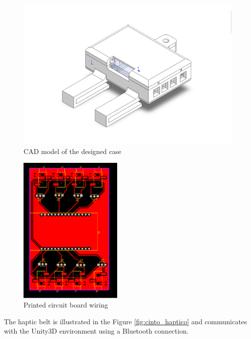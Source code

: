         \begin{figure}[!htb]
            \centering
            \includegraphics[width = 0.8\linewidth]{Metodologia/Case Cinto.png}
            \caption{CAD model of the designed case}
            \label{fig:case_cinto}
        \end{figure}

        \begin{figure}[htbp]
            \centering
            \includegraphics[width=0.45\textwidth, angle = 90, origin = c]{Metodologia/PCB Cinto.pdf}
            \caption{Printed circuit board wiring}
            \label{fig:pcb_wiring}
        \end{figure}

        The haptic belt is illustrated in the Figure \ref{fig:cinto_haptico} and communicates with the Unity3D environment using a Bluetooth connection.

